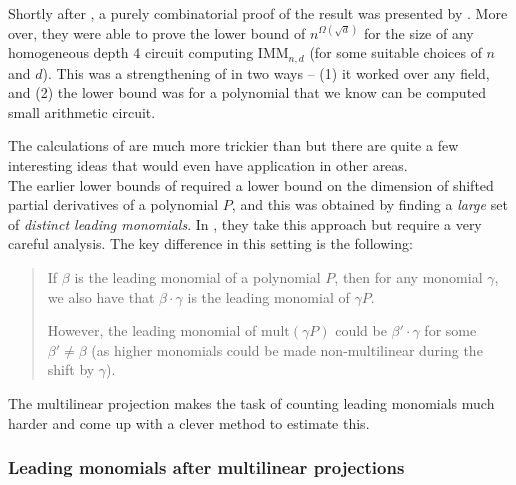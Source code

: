 \documentclass[12pt]{report}
\newcommand{\IMM}{\mathrm{IMM}}
\begin{document}
Shortly after \cite{KLSS}, a purely combinatorial proof of the result was presented by \cite{KS14}. More over, they were able to prove the lower bound of $n^{\Omega(\sqrt{d})}$ for the size of any homogeneous depth $4$ circuit computing $\IMM_{n,d}$ (for some suitable choices of $n$ and $d$). This was a strengthening of \cite{KLSS} in two ways -- (1) it worked over any field, and (2) the lower bound was for a polynomial that we know can be computed small arithmetic circuit. 

The calculations of \cite{KS14} are much more trickier than \cite{KLSS} but there are quite a few interesting ideas that would even have application in other areas. \\

The earlier lower bounds of \cite{gkks13,KSS13,FLMS13} required a lower bound on the dimension of shifted partial derivatives of a polynomial $P$, and this was obtained by finding a \emph{large} set of \emph{distinct leading monomials}. In \cite{KS14}, they take this approach but require a very careful analysis. The key difference in this setting is the following: 

\begin{quote}
  If $\beta$ is the leading monomial of a polynomial $P$, then for any monomial $\gamma$, we also have that $\beta \cdot \gamma$ is the leading monomial of $\gamma P$. 

  However, the leading monomial of $\mathrm{mult}(\gamma P)$ could be $\beta' \cdot \gamma$ for some $\beta' \neq \beta$ (as higher monomials could be made non-multilinear during the shift by $\gamma$). 
\end{quote}

The multilinear projection makes the task of counting leading monomials much harder and \cite{KS14} come up with a clever method to estimate this. 

\subsubsection*{Leading monomials after multilinear projections}
\end{document}
